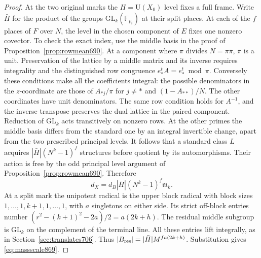 \documentclass[a4paper,11pt]{article}
\theoremstyle{definition}
\theoremstyle{remark}
\numberwithin{equation}{section}
\begin{document}
\begin{proof}
At the two original marks the \(H=\mathrm U(X_0)\) level fixes
a full frame. Write \(\bar H\) for the product of the groups
\(\mathrm{GL}_k(\mathbb F_{p_i})\) at their split places. At each
of the \(f\) places of \(F\) over \(N\), the level in the chosen
component of \(E\) fixes one nonzero covector. To check the exact
index, use the middle basis in the proof of
Proposition~\ref{prop:rowmean690}. At a component where \(\pi\)
divides \(N=\pi\bar\pi\), \(\bar\pi\) is a unit. Preservation of
the lattice by a middle matrix and its inverse requires integrality
and the distinguished row congruence \(e_*^t A=e_*^t\bmod\pi\).
Conversely these conditions make all the coefficients integral:
the possible denominators in the \(z\)-coordinate are those of
\(A_{*j}/\pi\) for \(j\ne *\) and \((1-A_{**})/N\). The other
coordinates have unit denominators. The same row condition holds for
\(A^{-1}\), and the inverse transpose preserves the dual lattice in
the paired component. Reduction of \(\mathrm{GL}_k\) acts
transitively on nonzero rows. At the other primes the middle basis
differs from the standard one by an integral invertible change,
apart from the two prescribed principal levels. It follows that a
standard class \(L\) acquires
\(|\bar H|(N^k-1)^f\) structures before quotient by its automorphisms.
Their action is free by the odd principal level argument of
Proposition~\ref{prop:rowmean690}. Therefore
\[
 d_X=d_B|\bar H|(N^k-1)^f\mathfrak m_k .
\]
At a split mark the unipotent radical is the upper block radical
with block sizes \(1,\ldots,1,k+1,1,\ldots,1\), with \(a\)
singletons on either side. Its strict off-block entries number
\((r^2-(k+1)^2-2a)/2=a(2k+h)\). The residual middle subgroup
is \(\mathrm{GL}_k\) on the complement of the terminal line.
All these entries lift integrally, as in
Section~\ref{sec:translates706}. Thus
\(|B_{\rm res}|=|\bar H|M^{fa(2k+h)}\). Substitution gives
\eqref{eq:massscale869}.


\end{proof}
\end{document}
